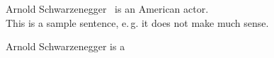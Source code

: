 \documentclass{article}
\newcommand{\arnold}{Arnold Schwarzenegger \ } %
\begin{document}
\arnold is an American actor.\\

\def\ACROe*{e.\,g.}
This is a sample sentence, \ACROe* it does not make much sense.

\def\arnold*{Arnold Schwarzenegger}
\arnold* is a
\end{document}
